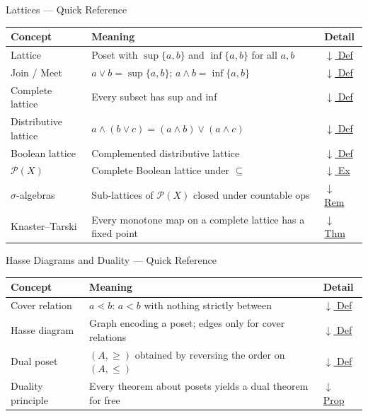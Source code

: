 \begin{toolkitbox}{Lattices --- Quick Reference}
\small
\begin{tabular}{l l l}
\toprule
\textbf{Concept} & \textbf{Meaning} & \textbf{Detail} \\
\midrule
Lattice              & Poset with $\sup\{a,b\}$ and $\inf\{a,b\}$ for all $a,b$   & \hyperref[def:lattice]{$\downarrow$ Def} \\
Join / Meet          & $a \vee b = \sup\{a,b\}$; $a \wedge b = \inf\{a,b\}$        & \hyperref[def:lattice]{$\downarrow$ Def} \\
Complete lattice     & Every subset has sup and inf                                & \hyperref[def:complete-lattice]{$\downarrow$ Def} \\
Distributive lattice & $a \wedge (b \vee c) = (a \wedge b) \vee (a \wedge c)$      & \hyperref[def:distributive-lattice]{$\downarrow$ Def} \\
Boolean lattice      & Complemented distributive lattice                           & \hyperref[def:boolean-lattice]{$\downarrow$ Def} \\
$\mathcal{P}(X)$     & Complete Boolean lattice under $\subseteq$                  & \hyperref[ex:power-set-lattice]{$\downarrow$ Ex} \\
$\sigma$-algebras    & Sub-lattices of $\mathcal{P}(X)$ closed under countable ops  & \hyperref[rem:sigma-alg-lattice]{$\downarrow$ Rem} \\
Knaster--Tarski      & Every monotone map on a complete lattice has a fixed point   & \hyperref[thm:knaster-tarski]{$\downarrow$ Thm} \\
\bottomrule
\end{tabular}
\end{toolkitbox}



\begin{toolkitbox}{Hasse Diagrams and Duality --- Quick Reference}
\small
\begin{tabular}{l l l}
\toprule
\textbf{Concept} & \textbf{Meaning} & \textbf{Detail} \\
\midrule
Cover relation    & $a \lessdot b$: $a < b$ with nothing strictly between       & \hyperref[def:cover-relation]{$\downarrow$ Def} \\
Hasse diagram     & Graph encoding a poset; edges only for cover relations      & \hyperref[def:hasse]{$\downarrow$ Def} \\
Dual poset        & $(A, \geq)$ obtained by reversing the order on $(A, \leq)$  & \hyperref[def:dual-poset]{$\downarrow$ Def} \\
Duality principle & Every theorem about posets yields a dual theorem for free   & \hyperref[prop:order-duality]{$\downarrow$ Prop} \\
\bottomrule
\end{tabular}
\end{toolkitbox}

